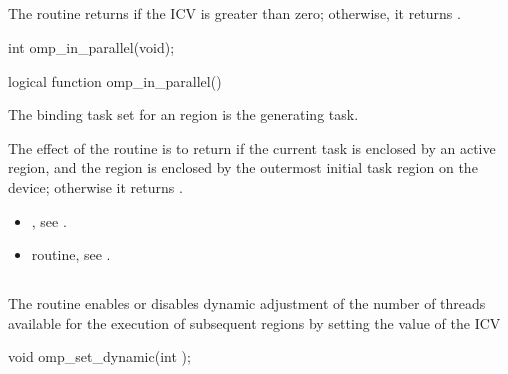 \subsection{}
\label{subsec:omp_in_parallel}
\summary
The  routine returns  if the  ICV is greater 
than zero; otherwise, it returns .

\pagebreak
\format
\ccppspecificstart
\begin{boxedcode}
int omp\_in\_parallel(void);
\end{boxedcode}
\ccppspecificend

\fortranspecificstart
\begin{boxedcode}
logical function omp\_in\_parallel()
\end{boxedcode}
\fortranspecificend

\binding
The binding task set for an  region is the generating task.

\effect
The effect of the  routine is to return  if the current task is 
enclosed by an active  region, and the  region is enclosed by the 
outermost initial task region on the device; otherwise it returns .

\crossreferences
\begin{itemize}
\item {}, see 
.

\item {} routine, see 
.
\end{itemize}








\bigskip
\subsection{}
\label{subsec:omp_set_dynamic}
\summary
The  routine enables or disables dynamic adjustment of the 
number of threads available for the execution of subsequent  regions by 
setting the value of the  ICV


\pagebreak
\format
\ccppspecificstart
\begin{boxedcode}
void omp\_set\_dynamic(int );
\end{boxedcode}
\ccppspecificend
\bigskip

